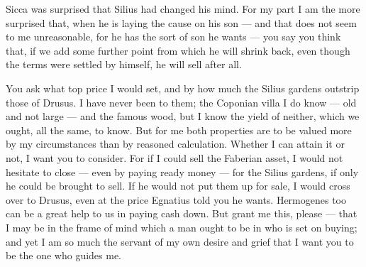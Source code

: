 

 Sicca was surprised that Silius had changed his mind. For my part I am the more surprised that, when he is laying the cause on his son --- and that does not seem to me unreasonable, for he has the sort of son he wants --- you say you think that, if we add some further point from which he will shrink back, even though the terms were settled by himself, he will sell after all.

 You ask what top price I would set, and by how much the Silius gardens outstrip those of Drusus. I have never been to them; the Coponian villa I do know --- old and not large --- and the famous wood, but I know the yield of neither, which we ought, all the same, to know. But for me both properties are to be valued more by my circumstances than by reasoned calculation. Whether I can attain it or not, I want you to consider. For if I could sell the Faberian asset, I would not hesitate to close --- even by paying ready money --- for the Silius gardens, if only he could be brought to sell. If he would not put them up for sale, I would cross over to Drusus, even at the price Egnatius told you he wants. Hermogenes too can be a great help to us in paying cash down. But grant me this, please --- that I may be in the frame of mind which a man ought to be in who is set on buying; and yet I am so much the servant of my own desire and grief that I want you to be the one who guides me.
